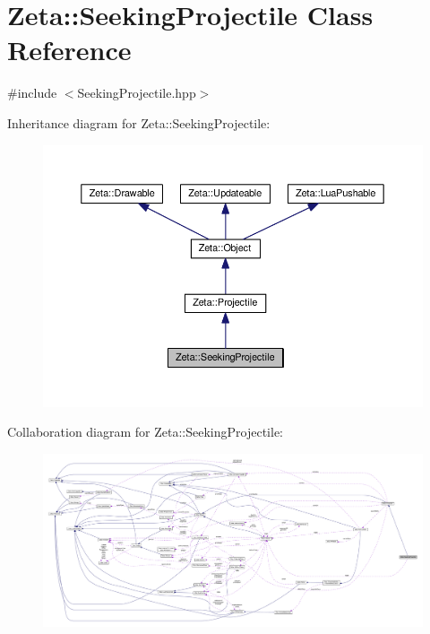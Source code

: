 \hypertarget{classZeta_1_1SeekingProjectile}{\section{Zeta\+:\+:Seeking\+Projectile Class Reference}
\label{classZeta_1_1SeekingProjectile}
}


{\ttfamily \#include $<$Seeking\+Projectile.\+hpp$>$}



Inheritance diagram for Zeta\+:\+:Seeking\+Projectile\+:\nopagebreak
\begin{figure}[H]
\begin{center}
\leavevmode
\includegraphics[width=350pt]{classZeta_1_1SeekingProjectile__inherit__graph}
\end{center}
\end{figure}


Collaboration diagram for Zeta\+:\+:Seeking\+Projectile\+:
\nopagebreak
\begin{figure}[H]
\begin{center}
\leavevmode
\includegraphics[width=350pt]{classZeta_1_1SeekingProjectile__coll__graph}
\end{center}
\end{figure}
